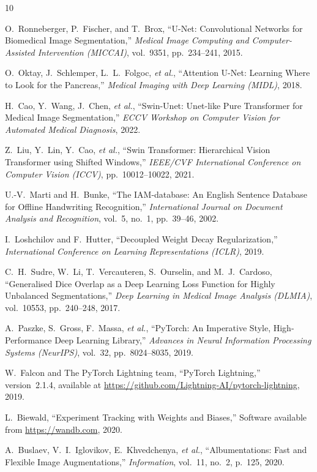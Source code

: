 \documentclass[a4paper,11pt]{article}
\begin{document}

\newpage
\begin{thebibliography}{10}

O.~Ronneberger, P.~Fischer, and T.~Brox,
``U-Net: Convolutional Networks for Biomedical Image Segmentation,''
\textit{Medical Image Computing and Computer-Assisted Intervention (MICCAI)},
vol.~9351, pp.~234--241, 2015.

O.~Oktay, J.~Schlemper, L.~L.~Folgoc, \emph{et al.},
``Attention U-Net: Learning Where to Look for the Pancreas,''
\textit{Medical Imaging with Deep Learning (MIDL)}, 2018.

H.~Cao, Y.~Wang, J.~Chen, \emph{et al.},
``Swin-Unet: Unet-like Pure Transformer for Medical Image Segmentation,''
\textit{ECCV Workshop on Computer Vision for Automated Medical Diagnosis}, 2022.

Z.~Liu, Y.~Lin, Y.~Cao, \emph{et al.},
``Swin Transformer: Hierarchical Vision Transformer using Shifted Windows,''
\textit{IEEE/CVF International Conference on Computer Vision (ICCV)},
pp.~10012--10022, 2021.

U.-V.~Marti and H.~Bunke,
``The IAM-database: An English Sentence Database for Offline Handwriting Recognition,''
\textit{International Journal on Document Analysis and Recognition},
vol.~5, no.~1, pp.~39--46, 2002.

I.~Loshchilov and F.~Hutter,
``Decoupled Weight Decay Regularization,''
\textit{International Conference on Learning Representations (ICLR)}, 2019.

C.~H.~Sudre, W.~Li, T.~Vercauteren, S.~Ourselin, and M.~J.~Cardoso,
``Generalised Dice Overlap as a Deep Learning Loss Function for Highly Unbalanced
Segmentations,''
\textit{Deep Learning in Medical Image Analysis (DLMIA)},
vol.~10553, pp.~240--248, 2017.

A.~Paszke, S.~Gross, F.~Massa, \emph{et al.},
``PyTorch: An Imperative Style, High-Performance Deep Learning Library,''
\textit{Advances in Neural Information Processing Systems (NeurIPS)},
vol.~32, pp.~8024--8035, 2019.

W.~Falcon and {The PyTorch Lightning team},
``PyTorch Lightning,''
version~2.1.4, available at \url{https://github.com/Lightning-AI/pytorch-lightning},
2019.

L.~Biewald,
``Experiment Tracking with Weights and Biases,''
Software available from \url{https://wandb.com}, 2020.

A.~Buslaev, V.~I.~Iglovikov, E.~Khvedchenya, \emph{et al.},
``Albumentations: Fast and Flexible Image Augmentations,''
\textit{Information}, vol.~11, no.~2, p.~125, 2020.

\end{thebibliography}
\end{document}
